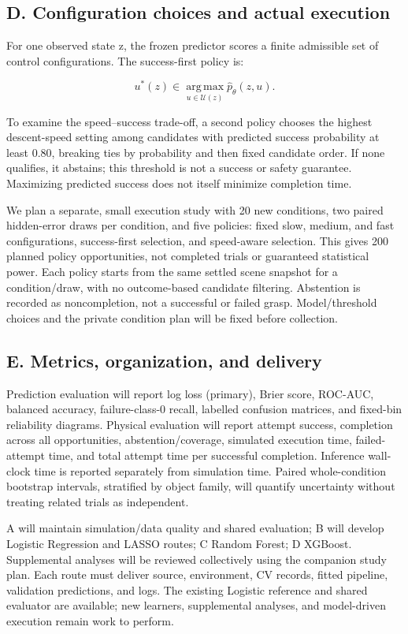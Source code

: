 \documentclass[11pt,letterpaper]{article}
\begin{document}
\subsection*{D. Configuration choices and actual execution}

For one observed state z, the frozen predictor scores a finite admissible set of control configurations. The success-first policy is:

\[
u^*(z) \in \operatorname*{arg\,max}_{u\in\mathcal U(z)}\widehat p_\theta(z,u).
\]

To examine the speed–success trade-off, a second policy chooses the highest descent-speed setting among candidates with predicted success probability at least 0.80, breaking ties by probability and then fixed candidate order. If none qualifies, it abstains; this threshold is not a success or safety guarantee. Maximizing predicted success does not itself minimize completion time.

We plan a separate, small execution study with 20 new conditions, two paired hidden-error draws per condition, and five policies: fixed slow, medium, and fast configurations, success-first selection, and speed-aware selection. This gives 200 planned policy opportunities, not completed trials or guaranteed statistical power. Each policy starts from the same settled scene snapshot for a condition/draw, with no outcome-based candidate filtering. Abstention is recorded as noncompletion, not a successful or failed grasp. Model/threshold choices and the private condition plan will be fixed before collection.

\subsection*{E. Metrics, organization, and delivery}

Prediction evaluation will report log loss (primary), Brier score, ROC-AUC, balanced accuracy, failure-class-0 recall, labelled confusion matrices, and fixed-bin reliability diagrams. Physical evaluation will report attempt success, completion across all opportunities, abstention/coverage, simulated execution time, failed-attempt time, and total attempt time per successful completion. Inference wall-clock time is reported separately from simulation time. Paired whole-condition bootstrap intervals, stratified by object family, will quantify uncertainty without treating related trials as independent.

A will maintain simulation/data quality and shared evaluation; B will develop Logistic Regression and LASSO routes; C Random Forest; D XGBoost. Supplemental analyses will be reviewed collectively using the companion study plan. Each route must deliver source, environment, CV records, fitted pipeline, validation predictions, and logs. The existing Logistic reference and shared evaluator are available; new learners, supplemental analyses, and model-driven execution remain work to perform.
\end{document}
